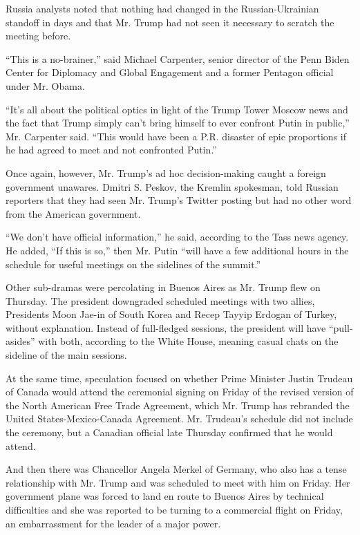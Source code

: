 Russia analysts noted that nothing had changed in the Russian-Ukrainian
standoff in days and that Mr. Trump had not seen it necessary to scratch
the meeting before.

``This is a no-brainer,'' said Michael Carpenter, senior director of the
Penn Biden Center for Diplomacy and Global Engagement and a former
Pentagon official under Mr. Obama.

``It's all about the political optics in light of the Trump Tower Moscow
news and the fact that Trump simply can't bring himself to ever confront
Putin in public,'' Mr. Carpenter said. ``This would have been a P.R.
disaster of epic proportions if he had agreed to meet and not confronted
Putin.''

Once again, however, Mr. Trump's ad hoc decision-making caught a foreign
government unawares. Dmitri S. Peskov, the Kremlin spokesman, told
Russian reporters that they had seen Mr. Trump's Twitter posting but had
no other word from the American government.

``We don't have official information,'' he said, according to the Tass
news agency. He added, ``If this is so,'' then Mr. Putin ``will have a
few additional hours in the schedule for useful meetings on the
sidelines of the summit.''

Other sub-dramas were percolating in Buenos Aires as Mr. Trump flew on
Thursday. The president downgraded scheduled meetings with two allies,
Presidents Moon Jae-in of South Korea and Recep Tayyip Erdogan of
Turkey, without explanation. Instead of full-fledged sessions, the
president will have ``pull-asides'' with both, according to the White
House, meaning casual chats on the sideline of the main sessions.

At the same time, speculation focused on whether Prime Minister Justin
Trudeau of Canada would attend the ceremonial signing on Friday of the
revised version of the North American Free Trade Agreement, which Mr.
Trump has rebranded the United States-Mexico-Canada Agreement. Mr.
Trudeau's schedule did not include the ceremony, but a Canadian official
late Thursday confirmed that he would attend.

And then there was Chancellor Angela Merkel of Germany, who also has a
tense relationship with Mr. Trump and was scheduled to meet with him on
Friday. Her government plane was forced to land en route to Buenos Aires
by technical difficulties and she was reported to be turning to a
commercial flight on Friday, an embarrassment for the leader of a major
power.

